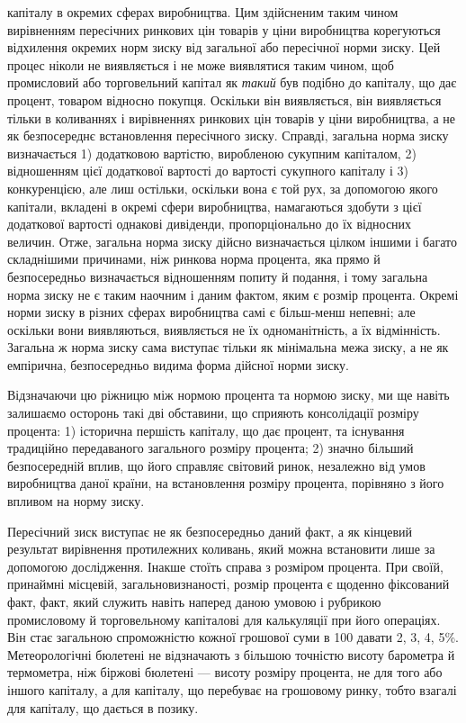 \parcont{}  %
капіталу в окремих сферах виробництва. Цим здійсненим таким
чином вирівненням пересічних ринкових цін товарів у ціни виробництва
корегуються відхилення окремих норм зиску від загальної
або пересічної норми зиску. Цей процес ніколи не
виявляється і не може виявлятися таким чином, щоб промисловий
або торговельний капітал як \emph{такий} був подібно до капіталу,
що дає процент, товаром відносно покупця. Оскільки він
виявляється, він виявляється тільки в коливаннях і вирівненнях
ринкових цін товарів у ціни виробництва, а не як безпосереднє
встановлення пересічного зиску. Справді, загальна норма зиску
визначається 1) додатковою вартістю, виробленою сукупним
капіталом, 2) відношенням цієї додаткової вартості до вартості
сукупного капіталу і 3) конкуренцією, але лиш остільки,
оскільки вона є той рух, за допомогою якого капітали, вкладені
в окремі сфери виробництва, намагаються здобути з цієї
додаткової вартості однакові дивіденди, пропорціонально до їх
відносних величин. Отже, загальна норма зиску дійсно визначається
цілком іншими і багато складнішими причинами, ніж ринкова
норма процента, яка прямо й безпосередньо визначається
відношенням попиту й подання, і тому загальна норма зиску
не є таким наочним і даним фактом, яким є розмір процента.
Окремі норми зиску в різних сферах виробництва самі є більш-менш
непевні; але оскільки вони виявляються, виявляється не
їх одноманітність, а їх відмінність. Загальна ж норма зиску сама
виступає тільки як мінімальна межа зиску, а не як емпірична,
безпосередньо видима форма дійсної норми зиску.

Відзначаючи цю ріжницю між нормою процента та нормою
зиску, ми ще навіть залишаємо осторонь такі дві обставини, що
сприяють консолідації розміру процента: 1) історична першість
капіталу, що дає процент, та існування традиційно передаваного
загального розміру процента; 2) значно більший безпосередній
вплив, що його справляє світовий ринок, незалежно від умов
виробництва даної країни, на встановлення розміру процента, порівняно
з його впливом на норму зиску.

Пересічний зиск виступає не як безпосередньо даний факт,
а як кінцевий результат вирівнення протилежних коливань, який
можна встановити лише за допомогою дослідження. Інакше
стоїть справа з розміром процента. При своїй, принаймні місцевій,
загальновизнаності, розмір процента є щоденно фіксований
факт, факт, який служить навіть наперед даною умовою і рубрикою
промисловому й торговельному капіталові для калькуляції
при його операціях. Він стає загальною спроможністю
кожної грошової суми в 100 давати 2, 3, 4,
5\%. Метеорологічні бюлетені не відзначають з більшою точністю
висоту барометра й термометра, ніж біржові бюлетені —
висоту розміру процента, не для того або іншого капіталу, а для
капіталу, що перебуває на грошовому ринку, тобто взагалі для
капіталу, що дається в позику.
